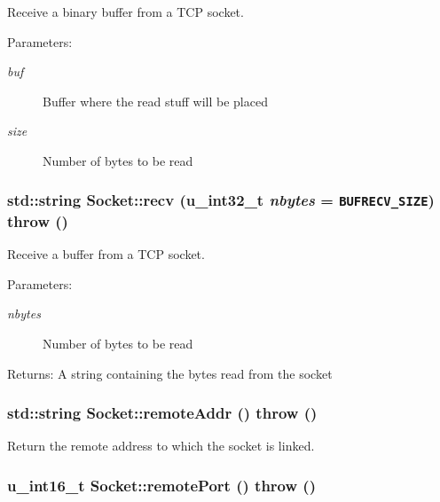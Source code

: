 Receive a binary buffer from a TCP socket. 

\begin{Desc}
\item[Parameters:]
\begin{description}
\item[{\em buf}]Buffer where the read stuff will be placed \item[{\em size}]Number of bytes to be read \end{description}
\end{Desc}
\hypertarget{classSocket_57cc2a29735f60474e5f274db39c9e0c}{
\subsubsection[{recv}]{\setlength{\rightskip}{0pt plus 5cm}std::string Socket::recv (u\_\-int32\_\-t {\em nbytes} = {\tt BUFRECV\_\-SIZE})  throw ()}}
\label{classSocket_57cc2a29735f60474e5f274db39c9e0c}


Receive a buffer from a TCP socket. 

\begin{Desc}
\item[Parameters:]
\begin{description}
\item[{\em nbytes}]Number of bytes to be read \end{description}
\end{Desc}
\begin{Desc}
\item[Returns:]A string containing the bytes read from the socket \end{Desc}
\hypertarget{classSocket_34aae0bd63e43ba30f91e77e52e95461}{
\subsubsection[{remoteAddr}]{\setlength{\rightskip}{0pt plus 5cm}std::string Socket::remoteAddr ()  throw ()}}
\label{classSocket_34aae0bd63e43ba30f91e77e52e95461}


Return the remote address to which the socket is linked. 

\hypertarget{classSocket_7cb1ce737346cbc92f7d1cc3d9578d38}{
\subsubsection[{remotePort}]{\setlength{\rightskip}{0pt plus 5cm}u\_\-int16\_\-t Socket::remotePort ()  throw ()}}
\label{classSocket_7cb1ce737346cbc92f7d1cc3d9578d38}


